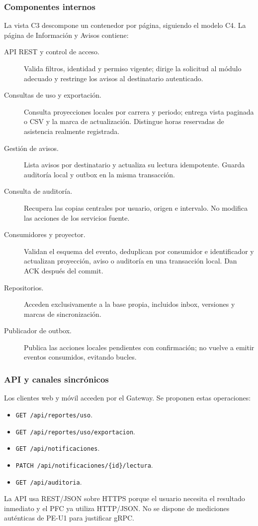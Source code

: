 \subsubsection{Componentes internos}
La vista C3 descompone un contenedor por página, siguiendo el modelo
C4\cite{brownC4Componentes}. La página de Información y Avisos contiene:
\begin{description}
\item[API REST y control de acceso.] Valida filtros, identidad y permiso
vigente; dirige la solicitud al módulo adecuado y restringe los avisos al
destinatario autenticado.
\item[Consultas de uso y exportación.] Consulta proyecciones locales por
carrera y periodo; entrega vista paginada o CSV y la marca de actualización.
Distingue horas reservadas de asistencia realmente registrada.
\item[Gestión de avisos.] Lista avisos por destinatario y actualiza su
lectura idempotente. Guarda auditoría local y outbox en la misma transacción.
\item[Consulta de auditoría.] Recupera las copias centrales por usuario,
origen e intervalo. No modifica las acciones de los servicios fuente.
\item[Consumidores y proyector.] Validan el esquema del evento,
deduplican por consumidor e identificador y actualizan proyección, aviso o
auditoría en una transacción local. Dan ACK después del commit.
\item[Repositorios.] Acceden exclusivamente a la base propia, incluidos
inbox, versiones y marcas de sincronización.
\item[Publicador de outbox.] Publica las acciones locales pendientes con
confirmación; no vuelve a emitir eventos consumidos, evitando bucles.
\end{description}

\subsubsection{API y canales sincrónicos}
Los clientes web y móvil acceden por el Gateway. Se proponen estas operaciones:
\begin{itemize}
\item \texttt{GET /api/reportes/uso}.
\item \texttt{GET /api/reportes/uso/exportacion}.
\item \texttt{GET /api/notificaciones}.
\item \texttt{PATCH /api/notificaciones/\{id\}/lectura}.
\item \texttt{GET /api/auditoria}.
\end{itemize}
La API usa REST/JSON sobre HTTPS porque
el usuario necesita el resultado inmediato y el PFC ya utiliza HTTP/JSON.
No se dispone de mediciones auténticas de PE-U1 para justificar gRPC.

